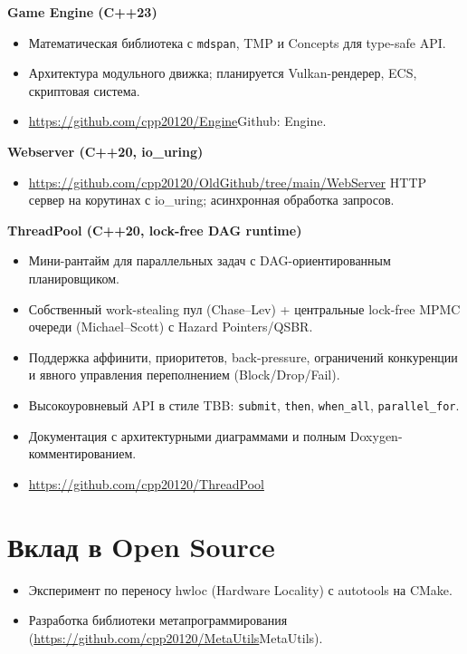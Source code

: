 \documentclass[a4paper,10pt]{article}
\begin{document}
\textbf{Game Engine (C++23)}  
\begin{itemize}[noitemsep]
    \item Математическая библиотека с \texttt{mdspan}, TMP и Concepts для type-safe API.
    \item Архитектура модульного движка; планируется Vulkan-рендерер, ECS, скриптовая система.
    \item \url{https://github.com/cpp20120/Engine}{Github: Engine}.
\end{itemize}

\textbf{Webserver (C++20, io\_uring)}  
\begin{itemize}[noitemsep]
    \item \url{https://github.com/cpp20120/OldGithub/tree/main/WebServer} HTTP сервер на корутинах с io\_uring; асинхронная обработка запросов.
\end{itemize}

\textbf{ThreadPool (C++20, lock-free DAG runtime)}  
\begin{itemize}[noitemsep]
    \item Мини-рантайм для параллельных задач с DAG-ориентированным планировщиком.
    \item Собственный work-stealing пул (Chase–Lev) + центральные lock-free MPMC очереди (Michael–Scott) с Hazard Pointers/QSBR.
    \item Поддержка аффинити, приоритетов, back-pressure, ограничений конкуренции и явного управления переполнением (Block/Drop/Fail).
    \item Высокоуровневый API в стиле TBB: \texttt{submit}, \texttt{then}, \texttt{when\_all}, \texttt{parallel\_for}.
    \item Документация с архитектурными диаграммами и полным Doxygen-комментированием.
    \item \url{https://github.com/cpp20120/ThreadPool}
\end{itemize}

\section*{Вклад в Open Source}
\begin{itemize}[noitemsep]
    \item Эксперимент по переносу hwloc (Hardware Locality) с autotools на CMake.
    \item Разработка библиотеки метапрограммирования (\url{https://github.com/cpp20120/MetaUtils}{MetaUtils}).
\end{itemize}
\end{document}
